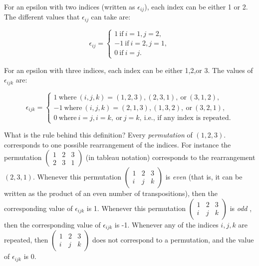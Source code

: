 For an epsilon with two indices (written as $\epsilon_{ij}$), each index can be either 1 or 2. The different values that $\epsilon_{ij}$ can take are:

\[ \epsilon_{ij}=
\begin{cases}
1 ~ \text{if} ~ i=1, j=2,  \\
-1 ~ \text{if} ~ i=2, j=1,  \\
0 ~ \text{if} ~ i=j.
\end{cases} \]

For an epsilon with three indices, each index can be either 1,2,or 3. The values of $\epsilon_{ijk}$ are:

\[ \epsilon_{ijk}=
\begin{cases}
1 ~ \text{where} ~ (i,j,k)= (1,2,3),  (2,3,1),  \mathrm{~or~}(3,1,2), \\
-1 ~ \text{where} ~ (i,j,k) = (2,1,3), (1,3,2),  \mathrm{~or~}(3,2,1),  \\
0 ~ \text{where} ~  i=j, i=k, ~ \text{or} ~ j=k, ~ \text{i.e., if any index is repeated.}
\end{cases} \]

What is the rule behind this definition?  Every \emph{permutation} of $(1,2,3)$.  corresponds to one possible rearrangement of the indices. For instance the permutation 
$ \left( \begin{smallmatrix}  1 & 2 & 3  \\ 2 & 3 & 1  \end{smallmatrix} \right)$ (in tableau notation) corresponds to the rearrangement $(2,3,1)$.  Whenever this permutation $\left( \begin{smallmatrix} 1 & 2 & 3  \\ i & j & k  \end{smallmatrix} \right) $ is \emph{even} (that is, it can be written as the product of an even number of transpositions), then the corresponding value of $\epsilon_{ijk}$ is 1. Whenever this permutation $\left( \begin{smallmatrix} 1 & 2 & 3  \\ i & j & k  \end{smallmatrix} \right)$ is \emph{odd} , then the corresponding value of $\epsilon_{ijk}$ is -1. Whenever any of the indices $i,j,k$  are repeated, then  $\left( \begin{smallmatrix} 1 & 2 & 3  \\ i & j & k  \end{smallmatrix} \right) $ does not correspond to a permutation, and the value of $\epsilon_{ijk}$ is 0.


